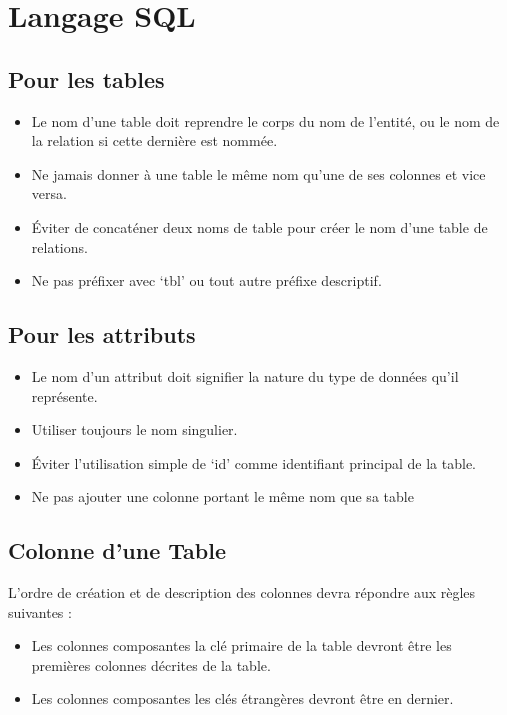\documentclass[11pt,fleqn]{book} %
\begin{document}
\section{Langage SQL}
\subsection{Pour les tables}
\begin{itemize}
    \item  Le nom d’une table doit reprendre le corps du nom de l'entité, ou le nom de la relation si cette dernière est nommée.
    \item  Ne jamais donner à une table le même nom qu'une de ses colonnes et vice versa.
    \item  Éviter de concaténer deux noms de table pour créer le nom d'une table de relations.
    \item  Ne pas préfixer avec ‘tbl’ ou tout autre préfixe descriptif.

\end{itemize}
\subsection{Pour les attributs}
\begin{itemize}
    \item Le nom d'un attribut doit signifier la nature du type de données qu'il représente.
    \item  Utiliser toujours le nom singulier.
    \item  Éviter l'utilisation simple de ‘id’ comme identifiant principal de la table.
    \item   Ne pas ajouter une colonne portant le même nom que sa table
\end{itemize}
\subsection{Colonne d’une Table}
L'ordre de création et de description des colonnes devra répondre aux règles 
suivantes :
\begin{itemize}
    \item  Les colonnes composantes la clé primaire de la table devront être les premières colonnes décrites de la table.
    \item  Les colonnes composantes les clés étrangères devront être en dernier.
\end{itemize}
\end{document}
